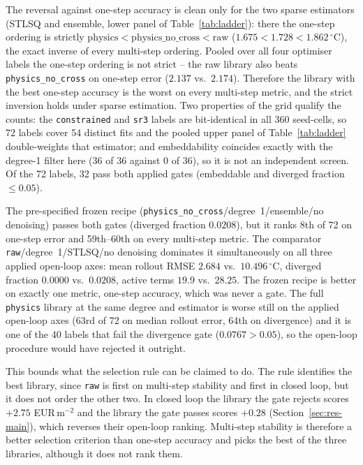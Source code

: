 The reversal against one-step accuracy is clean only for the two sparse estimators
(STLSQ and ensemble, lower panel of Table~\ref{tab:ladder}): there the one-step ordering
is strictly $\text{physics} < \text{physics\_no\_cross} < \text{raw}$
($1.675 < 1.728 < 1.862\,^\circ$C), the exact inverse of every multi-step ordering.
Pooled over all four optimiser labels the one-step ordering is not strict -- the raw
library also beats \texttt{physics\_no\_cross} on one-step error ($2.137$ vs.\ $2.174$).
Therefore the library with the best one-step accuracy is the worst on every multi-step
metric, and the strict inversion holds under sparse estimation. Two properties of the grid
qualify the counts: the \texttt{constrained} and \texttt{sr3} labels are bit-identical in
all 360 seed-cells, so 72 labels cover 54 distinct fits and the pooled upper panel of
Table~\ref{tab:ladder} double-weights that estimator;
and embeddability coincides exactly with the degree-1 filter here (36 of 36 against
0 of 36), so it is not an independent screen. Of the 72 labels, 32 pass both
applied gates (embeddable and diverged fraction $\le 0.05$).

The pre-specified frozen recipe
(\texttt{physics\_no\_cross}/degree~1/ensemble/no denoising) passes both gates
(diverged fraction $0.0208$), but it ranks 8th of 72 on one-step error and 59th--60th on
every multi-step metric. The comparator \texttt{raw}/degree~1/STLSQ/no denoising
dominates it simultaneously on all three applied open-loop axes: mean rollout RMSE $2.684$
vs.\ $10.496\,^\circ$C, diverged fraction $0.0000$ vs.\ $0.0208$, active terms $19.9$ vs.\
$28.25$. The frozen recipe is better on exactly one metric, one-step accuracy, which was
never a gate. The full \texttt{physics} library at the same degree and estimator is worse
still on the applied open-loop axes (63rd of 72 on median rollout error, 64th on divergence) and it is one of the 40 labels that fail the divergence gate
($0.0767 > 0.05$), so the open-loop procedure would have rejected it outright.

This bounds what the selection rule can be claimed to do. The rule identifies the best
library, since \texttt{raw} is first on multi-step stability and first in closed loop, but
it does not order the other two. In closed loop the library the gate rejects scores $+2.75$
EUR\,m$^{-2}$ and the library the gate passes scores $+0.28$ (Section~\ref{sec:res-main}), which
reverses their open-loop ranking. Multi-step stability is therefore a better selection
criterion than one-step accuracy and picks the best of the three libraries, although it
does not rank them.


